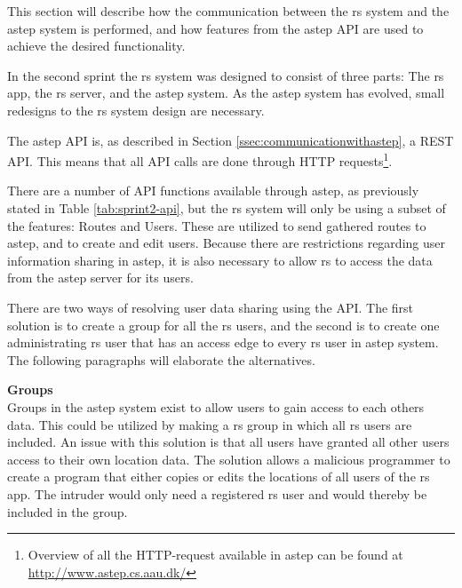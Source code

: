 This section will describe how the communication between the \gls{rs} system and the \gls{astep} system is performed, and how features from the \gls{astep} API are used to achieve the desired functionality.

In the second sprint the \gls{rs} system was designed to consist of three parts: The \gls{rs} app, the \gls{rs} server, and the \gls{astep} system.
As the \gls{astep} system has evolved, small redesigns to the \gls{rs} system design are necessary.

The \gls{astep} API is, as described in Section \ref{ssec:communicationwithastep}, a REST API. 
This means that all API calls are done through HTTP requests\footnote{Overview of all the HTTP-request available in \gls{astep} can be found at \url{http://www.astep.cs.aau.dk/}}.

There are a number of API functions available through \gls{astep}, as previously stated in Table \ref{tab:sprint2-api}, but the \gls{rs} system will only be using a subset of the features: Routes and Users.
These are utilized to send gathered routes to \gls{astep}, and to create and edit users.
Because there are restrictions regarding user information sharing in \gls{astep}, it is also necessary to allow \gls{rs} to access the data from the \gls{astep} server for its users.

There are two ways of resolving user data sharing using the API.
The first solution is to create a group for all the \gls{rs} users, and the second is to create one administrating \gls{rs} user that has an access edge to every \gls{rs} user in \gls{astep} system.
The following paragraphs will elaborate the alternatives.

\textbf{Groups}\\ 
Groups in the \gls{astep} system exist to allow users to gain access to each others data.
This could be utilized by making a \gls{rs} group in which all \gls{rs} users are included.
An issue with this solution is that all users have granted all other users access to their own location data. 
The solution allows a malicious programmer to create a program that either copies or edits the locations of all users of the \gls{rs} app.
The intruder would only need a registered \gls{rs} user and would thereby be included in the group.

